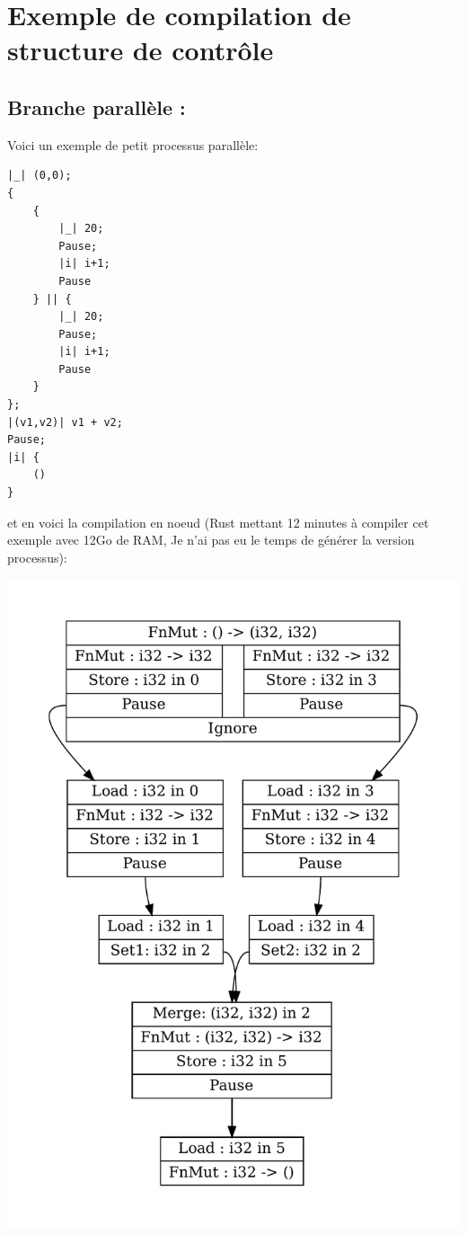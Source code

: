 \documentclass[a4paper]{article}
\renewcommand{\(}{\left(}
\renewcommand{\)}{\right)}
\begin{document}
\section{Exemple de compilation de structure de contrôle}

\subsection{Branche parallèle :}

Voici un exemple de petit processus parallèle:
\begin{verbatim}
|_| (0,0);
{
    {
        |_| 20;
        Pause;
        |i| i+1;
        Pause
    } || {
        |_| 20;
        Pause;
        |i| i+1;
        Pause
    }
};
|(v1,v2)| v1 + v2;
Pause;
|i| {
    ()
}
\end{verbatim}

et en voici la compilation en noeud (Rust mettant 12 minutes à compiler cet
exemple avec 12Go de RAM, Je n'ai pas eu le temps de générer la version processus):
\begin{center}
\includegraphics[scale=0.8]{test.pdf}
\end{center}
\end{document}
